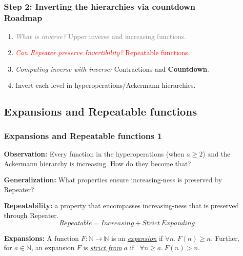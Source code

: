 \subsection*{}
\begin{frame}
\frametitle{Step 2: Inverting the hierarchies via countdown\\ Roadmap}
\begin{enumerate}\itemsep2em
	\item \textcolor<1-2>{gray}{\emph{What is inverse?} Upper inverse and increasing functions.}
	\item \textcolor<2>{red}{\emph{Can Repeater preserve Invertibility?} Repeatable functions.}
	\item \emph{Computing inverse with inverse:} Contractions and \textbf{Countdown}.
	\item Invert each level in hyperoperations/Ackermann hierarchies.
\end{enumerate}
\end{frame}


\subsection{Expansions and Repeatable functions}

\begin{frame}
\frametitle{Expansions and Repeatable functions 1}

\textbf{Observation:} Every function in the hyperoperations (when $a\ge 2$) and the Ackermann hierarchy is increasing. How do they become that?

\smallskip

\textbf{Generalization:} What properties ensure increasing-ness is preserved by Repeater?

\bigskip

\textbf{Repeatability:} a property that encompasses increasing-ness that is preserved through Repeater.
\begin{equation*}
Repeatable = Increasing + Strict \ Expanding
\end{equation*}

\textbf{Expansions:} A function $F:\mathbb{N}\to\mathbb{N}$ is an
\href{https://github.com/inv-ack/inv-ack/blob/7270e64a2600b771f2b1b1b151f7d13fb2ae6c97/increasing_expanding.v\#L80-L82}{\emph{expansion}} if $\forall n.~ F(n)\ge n$. Further, for $a\in \mathbb{N}$, an expansion $F$ is
\href{https://github.com/inv-ack/inv-ack/blob/7270e64a2600b771f2b1b1b151f7d13fb2ae6c97/increasing_expanding.v\#L84-L86}{\emph{strict from}} $a$ if ~$\forall n \ge a.~ F(n) > n$.
\end{frame}


